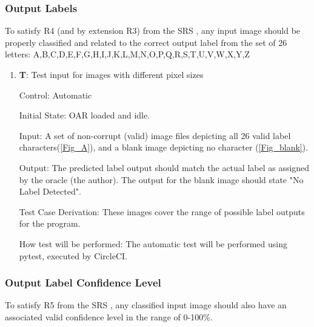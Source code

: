 \documentclass[12pt, titlepage]{article}
\newcounter{testnum} %
\begin{document}
\subsubsection{Output Labels}

To satisfy R4 (and by extension R3) from the SRS \citep{SRS}, any input image should be properly classified and related to the 
correct output label from the set of 26 letters: {A,B,C,D,E,F,G,H,I,J,K,L,M,N,O,P,Q,R,S,T,U,V,W,X,Y,Z}

\begin{enumerate}

  \item{\textbf{T\thetestnum \label{T_outputLabel}}: Test input for images with different pixel sizes\\}
            
  Control: Automatic
            
  Initial State: OAR loaded and idle.
            
  Input: A set of non-corrupt (valid) image files depicting all 26 valid label characters(\ref{Fig_A}), and a blank image depicting no character (\ref{Fig_blank}).
            
  Output: The predicted label output should match the actual label as assigned by the oracle (the author). The output for the blank image
  should state "No Label Detected".
            
  Test Case Derivation: These images cover the range of possible label outputs for the program.
            
  How test will be performed: The automatic test will be performed using pytest, executed by CircleCI.
\end{enumerate}

\subsubsection{Output Label Confidence Level}

To satisfy R5 from the SRS \citep{SRS}, any classified input image should also have an associated valid confidence level in the range of
0-100\%.
\end{document}
